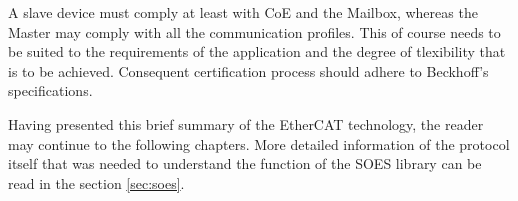 A slave device must comply at least with CoE and the Mailbox, whereas the Master may comply with all the communication profiles. This of course
needs to be suited to the requirements of the application and the degree of tlexibility that is to be achieved. Consequent certification process
should adhere to Beckhoff's specifications.\cite{beckhoff_slavetutorial} %

Having presented this brief summary of the EtherCAT technology, the reader may continue to the following chapters. 
More detailed information of the protocol itself that was needed to understand the function of the SOES library
can be read in the section \ref{sec:soes}.





